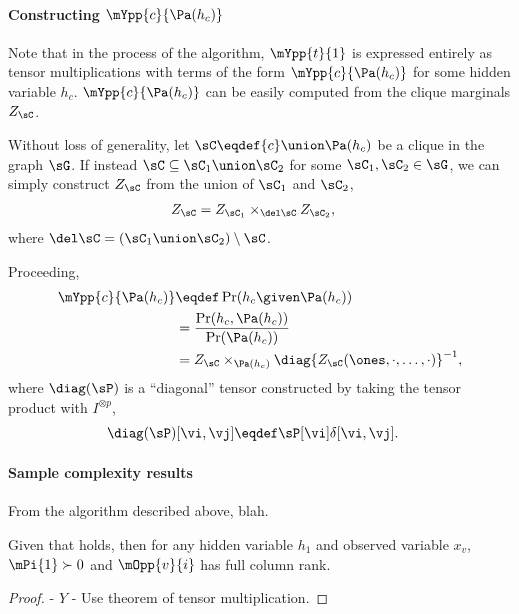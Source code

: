 \paragraph{Constructing $\mYpp{c}{\Pa(h_c)}$}

Note that in the process of the algorithm, $\mYpp{t}{1}$ is expressed
entirely as tensor multiplications with terms of the form
$\mYpp{c}{\Pa(h_c)}$ for some hidden variable $h_c$. 
$\mYpp{c}{\Pa(h_c)}$ can be easily computed from the clique marginals
$Z_\sC$.

Without loss of generality, let $\sC \eqdef \{c\} \union \Pa(h_c)$ be a clique
  in the graph $\sG$.
If instead $\sC \subseteq \sC_1 \union \sC_2$ for some $\sC_1, \sC_2 \in
  \sG$, we can simply construct $Z_{\sC}$ from the union of $\sC_1$ and
  $\sC_2$,
\begin{align*}
  Z_\sC &= Z_{\sC_1} \times_{\del \sC} Z_{\sC_2},
\end{align*}
where $\del \sC = (\sC_1 \union \sC_2) \setminus \sC$.

Proceeding,
\begin{align*}
\mYpp{c}{\Pa(h_c)} 
  &\eqdef \Pr(h_c \given \Pa(h_c)) \\
  &= \frac{\Pr(h_c, \Pa(h_c))}{\Pr(\Pa(h_c))} \\
  &= Z_\sC \times_{\Pa(h_c)} \diag{Z_\sC(\ones, \cdot, \ldots, \cdot)}^{-1},
\end{align*}
where $\diag(\sP)$ is a ``diagonal'' tensor constructed by taking the
tensor product with $I^{\otimes p}$,
\begin{align*}
  \diag(\sP)[\vi,\vj] &\eqdef \sP[\vi] \delta[\vi,\vj].
\end{align*}

\paragraph{Sample complexity results}

From the algorithm described above, blah.

\begin{lemma}
  \label{lem:full-rank-suff}
  Given that  holds, then for any hidden
  variable $h_1$ and observed variable $x_v$, $\mPi{1} \succ 0$ and
  $\mOpp{v}{i}$ has full column rank.
\end{lemma}
\begin{proof}

  - $Y$
  - Use theorem of tensor multiplication.
\end{proof}

